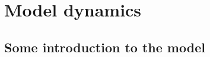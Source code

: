 \documentclass[a4paper,11pt]{kth-mag}
\begin{document}

\section{Model dynamics} \label{chapter: state space}
\subsection{Some introduction to the model}
\end{document}
